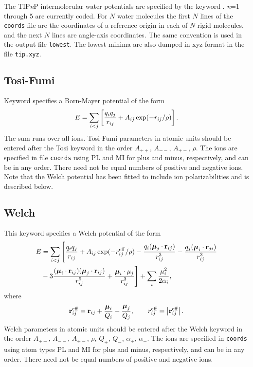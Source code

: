{The TIP{\it n\/}P intermolecular water potentials are specified by the keyword {\/}.
{\it n\/}=1 through 5 are currently coded. For $N$ water molecules the first $N$ lines of
the {\tt coords} file are the coordinates of a reference origin in each of $N$ rigid molecules,
and the next $N$ lines are angle-axis coordinates. The same convention is used in the output
file {\tt lowest}. The lowest minima are also dumped in xyz format in the file {\tt tip.xyz}.

\subsection{Tosi-Fumi}
 
Keyword {\/} specifies a Born-Mayer potential of the form
$$ E = \sum_{i<j}\left[ {q_i q_j\over r_{ij}} + A_{ij}\exp(-r_{ij}/\rho) \right]. $$
The sum runs over all ions. Tosi-Fumi\cite{tosif64} parameters in atomic units should be
entered after the Tosi keyword in the order $A_{++}$, $A_{--}$, $A_{+-}$, $\rho$.
The ions are specified in file {\tt coords} using PL and MI for plus and minus, respectively,
and can be in any order. There need not be equal numbers of positive and negative ions.
Note that the Welch potential has been fitted to include ion polarizabilities and is described below.

\subsection{Welch}This keyword specifies a Welch potential\cite{welchld76,phillipscb91} of the form
\begin{eqnarray*}
E &= \sum_{i<j}\Bigg[ {\displaystyle q_i q_j\over\displaystyle  r_{ij}} + A_{ij}\exp(-r_{ij}^{\rm eff}/\rho)
              -{\displaystyle q_i({\boldsymbol \mu}_j\cdot{\bf r}_{ij})\over\displaystyle  r_{ij}^3}
              -{\displaystyle q_j({\boldsymbol \mu}_i\cdot{\bf r}_{ji})\over\displaystyle  r_{ij}^3} \\
             &-3{\displaystyle   ({\boldsymbol \mu}_i\cdot{\bf r}_{ij})
                   ({\boldsymbol \mu}_j\cdot{\bf r}_{ij})\over\displaystyle  r_{ij}^5}
              +{\displaystyle  {\boldsymbol \mu}_i\cdot{{\bf{\mu}}}_j\over\displaystyle  r_{ij}^3}\Bigg]
              +\sum_i {\displaystyle \mu_i^2\over\displaystyle 2\alpha_i}, \\
\end{eqnarray*}
where
$$ {\bf r}_{ij}^{\rm eff}={\bf r}_{ij}+{{\boldsymbol \mu}_i\over Q_i}-{{\boldsymbol \mu}_j\over Q_j},
    \qquad r_{ij}^{\rm eff}=\left|{\bf r}_{ij}^{\rm eff}\right|. $$
Welch parameters in atomic units should be
entered after the Welch keyword in the order $A_{++}$, $A_{--}$, $A_{+-}$, $\rho$, $Q_+$,
$Q_-$, $\alpha_+$, $\alpha_-$.
The ions are specified in {\tt coords}  using atom types PL and MI for plus and minus, respectively,
and can be in any order. There need not be equal numbers of positive and negative ions.

}
